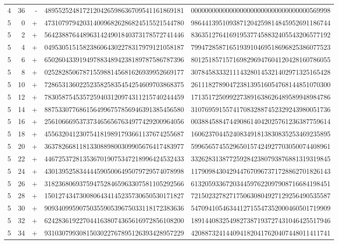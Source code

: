 \begin{longtable}{rrrll}
4 & 36 & - & 4895525248172120426598636709541161869181 & 0000000000000000000000000000000000569998 \\
5 & 0 & + & 4731079794203140096826286824515521544780 & 9864413951093871204259814845952691186744 \\
5 & 2 & + & 5642388764489631424901840373178572741446 & 8363512764169195377458832405543206577192 \\
5 & 4 & + & 0495305151582386064302278317979121058187 & 7994728587165193910469518696825386077523 \\
5 & 6 & + & 6502604339194978834894238189787586787396 & 8012518571571698296947604120428160786055 \\
5 & 8 & + & 0252828506787155988145681626939952669177 & 3078458333211143280145321402971325165428 \\
5 & 10 & + & 7286531360225235825835454254609703868375 & 2611182789047238139516054768144851070300 \\
5 & 12 & + & 7830587545357259403120974311215740244459 & 1713517250992273891638626489589948984786 \\
5 & 14 & + & 8875330776861564996757856946391385456580 & 3107695915574170832887452329243980051736 \\
5 & 16 & + & 2561066695373734656567634977429200964056 & 0038845884744908614042025761236387759614 \\
5 & 18 & + & 4556320412307541819891793661137674255687 & 1606237044524083491813830835253469235895 \\
5 & 20 & + & 3637826681181330889800309905676417483977 & 5996565745529650157424927703050074408961 \\
5 & 22 & + & 4467253728135367019075347218996424532433 & 3326283138772592842380793876881319319845 \\
5 & 24 & + & 4301395258344445905006495079729574078998 & 1179098430429447670967371728862701826143 \\
5 & 26 & + & 3182368069375947528465963307581105292566 & 6132059336720344597622097908716684198451 \\
5 & 28 & + & 1501274347300806434145235730650530171827 & 7215023278271750630804927129256490535587 \\
5 & 30 & + & 9093409959075035590539675033118172383636 & 5470941054634412715547352000460501719909 \\
5 & 32 & + & 6242836192270441638074365616972856108200 & 1891440832549827387193727431046425517946 \\
5 & 34 & + & 9310307993081503022767895126393428957229 & 4208873241440941820417620407448011411741 \\

\end{longtable}
